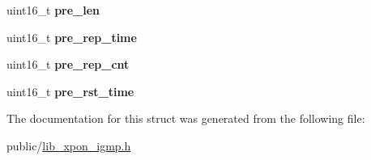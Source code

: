 \begin{DoxyCompactItemize}
\item 
\mbox{\label{structigmpRuleInfo__s_a17bb755d1b15b3462dd193a1f2fbdcd3}} 
uint16\+\_\+t {\bfseries pre\+\_\+len}
\item 
\mbox{\label{structigmpRuleInfo__s_a52530b479091d8826f4be6de1c9bcc38}} 
uint16\+\_\+t {\bfseries pre\+\_\+rep\+\_\+time}
\item 
\mbox{\label{structigmpRuleInfo__s_aef87874d9c3e5c3f8d02e6df634aacb4}} 
uint16\+\_\+t {\bfseries pre\+\_\+rep\+\_\+cnt}
\item 
\mbox{\label{structigmpRuleInfo__s_a5cba5536276ee826a74b07fa44e71198}} 
uint16\+\_\+t {\bfseries pre\+\_\+rst\+\_\+time}
\end{DoxyCompactItemize}


The documentation for this struct was generated from the following file\+:\begin{DoxyCompactItemize}
\item 
public/\hyperlink{lib__xpon__igmp_8h}{lib\+\_\+xpon\+\_\+igmp.\+h}\end{DoxyCompactItemize}
